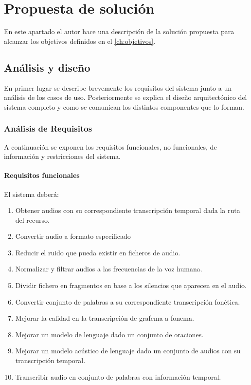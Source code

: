 \documentclass[../main.tex]{subfiles}
\begin{document}
\chapter{Propuesta de solución}\label{ch:propuesta_solucion}
En este apartado el autor hace una descripción de la solución propuesta para alcanzar los objetivos definidos en el \autoref{ch:objetivos}.

\section{Análisis y diseño}\label{sec:analisis_diseno}
En primer lugar se describe brevemente los requisitos del sistema junto a un análisis de los casos de uso. Posteriormente se explica el diseño arquitectónico del sistema completo y como se comunican los distintos componentes que lo forman.

\subsection{Análisis de Requisitos}\label{subsec:analisis_requisitos}
A continuación se exponen los requisitos funcionales, no funcionales, de información y restricciones del sistema.

\subsubsection{Requisitos funcionales}\label{subsubsec:req_funcionales}
El sistema deberá:

\begin{enumerate}
    \item Obtener audios con su correspondiente transcripción temporal dada la ruta del recurso.
    \item Convertir audio a formato especificado
    \item Reducir el ruido que pueda existir en ficheros de audio.
    \item Normalizar y filtrar audios a las frecuencias de la voz humana.
    \item Dividir fichero en fragmentos en base a los silencios que aparecen en el audio.
    \item Convertir conjunto de palabras a su correspondiente transcripción fonética.
    \item Mejorar la calidad en la transcripción de grafema a fonema.
    \item Mejorar un modelo de lenguaje dado un conjunto de oraciones.
    \item Mejorar un modelo acústico de lenguaje dado un conjunto de audios con su transcripción temporal.
    \item Transcribir audio en conjunto de palabras con información temporal.
\end{enumerate}
\end{document}

